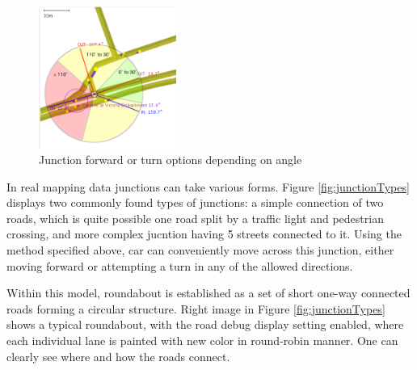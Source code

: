 \begin{figure}[h]
    \caption{Junction forward or turn options depending on angle }
    \label{fig:forwardOrTurnOption}
    \centering
    \includegraphics[width=0.4\textwidth]{figs/junction/junction_car_incoming_angle_with_turn_sectors.png}
\end{figure}

In real mapping data junctions can take various forms. Figure \ref{fig:junctionTypes} displays two commonly found types of junctions: a simple connection of two roads, which is quite possible one road split by a traffic light and pedestrian crossing, and more complex jucntion having 5 streets connected to it. Using the method specified above, car can conveniently move across this junction, either moving forward or attempting a turn in any of the allowed directions.

Within this model, roundabout is established as a set of short one-way connected roads forming a circular structure. Right image in Figure \ref{fig:junctionTypes} shows a typical roundabout, with the road debug display setting enabled, where each individual lane is painted with new color in round-robin manner. One can clearly see where and how the roads connect.

